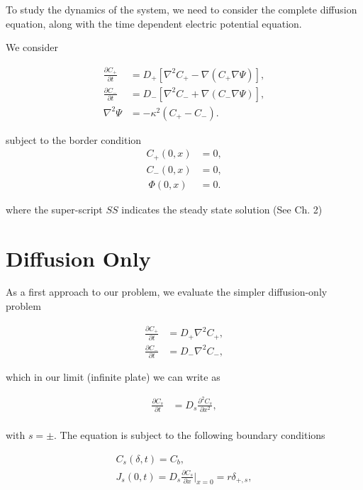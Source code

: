 
To study the dynamics of the system, we need to consider the complete diffusion equation, along with the time dependent electric potential equation.

We consider

\begin{align}
\frac{\partial C_+}{\partial t} &= D_+ \left[\nabla^2 C_+ -  \nabla (C_+ \nabla \Psi) \right] , \\
\frac{\partial C_-}{\partial t} &= D_- \left[\nabla^2 C_- + \nabla (C_- \nabla \Psi) \right], \\
\nabla^2 \Psi &= -\kappa^2 \left(C_+ - C_- \right).
\label{eq:dynamic-system}
\end{align}

subject to the border condition 
\begin{align}
C_+(0, x) & = 0,\\
C_-(0, x) & =  0,\\\
\Phi(0, x) &= 0.
\end{align}

where the super-script $SS$ indicates the steady state solution (See Ch. 2)%

\section{Diffusion Only}

As a first approach to our problem, we evaluate the simpler diffusion-only problem



\begin{align}
\frac{\partial C_+}{\partial t} &= D_+ \nabla^2 C_+,\\
\frac{\partial C_-}{\partial t} &= D_- \nabla^2 C_-,
\label{eq:diffusion}
\end{align}

which in our limit (infinite plate) we can write as


\begin{align}
\frac{\partial C_s}{\partial t} &= D_s \frac{\partial^2 C_s}{\partial x^2},\\
\label{eq:diffusion-1d}
\end{align}

with $s=\pm$. The equation is subject to the following boundary conditions


\begin{align}
C_s(\delta, t) = C_b,\\
J_s(0,t) = D_s\frac{\partial C_s}{\partial x}\big|_{x=0} = r\delta_{+,s},
\label{eq:diffusion-bc}
\end{align}

